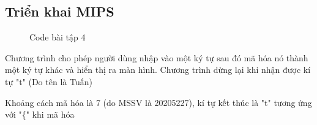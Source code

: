 \documentclass[a4paper,12pt]{article}
\begin{document}
\subsection{Triển khai MIPS}
\FloatBarrier
\begin{figure}[ht!]
	\centerline{}
	\caption{Code bài tập 4}
	\label{fig:ass1}
\end{figure}
\noindent
Chương trình cho phép người dùng nhập vào một ký tự sau đó mã hóa nó thành một ký tự khác và hiển thị ra màn hình. Chương trình dừng lại khi nhận được kí tự "t" (Do tên là Tuấn) \\
\FloatBarrier
\begin{figure}[ht!]
	\centerline{}
	\caption*{}
	\label{fig:ass1}
\end{figure}
\noindent
Khoảng cách mã hóa là 7 (do MSSV là 20205227), kí tự kết thúc là "t" tương ứng với "\{" khi mã hóa
\FloatBarrier
\end{document}
